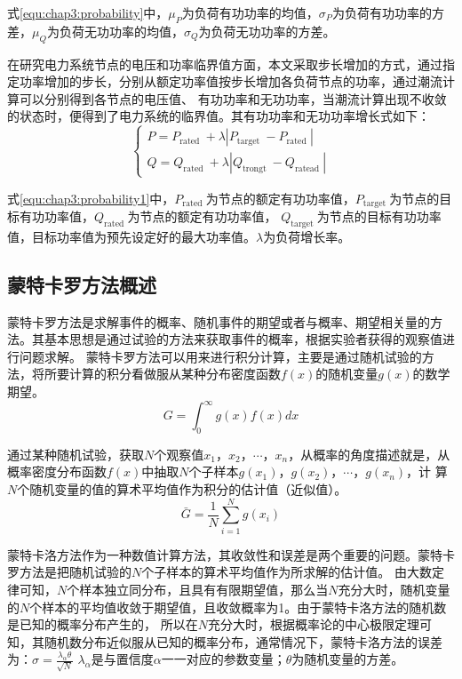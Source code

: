 式\ref{equ:chap3:probability}中，$\mu_{P}$为负荷有功功率的均值，$\sigma_{P}$为负荷有功功率的方差，$\mu_{Q}$为负荷无功功率的均值，$\sigma_{Q}$为负荷无功功率的方差。

在研究电力系统节点的电压和功率临界值方面，本文采取步长增加的方式，通过指定功率增加的步长，分别从额定功率值按步长增加各负荷节点的功率，通过潮流计算可以分别得到各节点的电压值、
有功功率和无功功率，当潮流计算出现不收敛的状态时，便得到了电力系统的临界值。其有功功率和无功功率增长式如下：
\begin{equation}
  \label{equ:chap3:probability1}
  \left\{\begin{array}{l}{P=P_{\text {rated }}+\lambda\left|P_{\text {target }}-P_{\text {rated }}\right|} \\
   {Q=Q_{\text {rated }}+\lambda\left|Q_{\text {trongt }}-Q_{\text {ratead }}\right|}\end{array}\right.
\end{equation}

式\ref{equ:chap3:probability1}中，$P_{\text {rated }}$为节点的额定有功功率值，$P_{\text {target }}$为节点的目标有功功率值，$Q_{\text {rated }}$为节点的额定有功功率值，
$Q_{\text {target }}$为节点的目标有功功率值，目标功率值为预先设定好的最大功率值。$\lambda$为负荷增长率。


\subsection{蒙特卡罗方法概述}
\label{sec:vulneStaus}
蒙特卡罗方法是求解事件的概率、随机事件的期望或者与概率、期望相关量的方法。其基本思想是通过试验的方法来获取事件的概率，根据实验者获得的观察值进行问题求解\cite{refs73,refs74,refs75}。
蒙特卡罗方法可以用来进行积分计算，主要是通过随机试验的方法，将所要计算的积分看做服从某种分布密度函数$f(x)$的随机变量$g(x)$的数学期望。
\begin{equation}
  G=\int_{0}^{\infty} g(x) f(x) d x
  \end{equation}

通过某种随机试验，获取$N$个观察值$x_1，x_2，\cdots，x_n$，从概率的角度描述就是，从概率密度分布函数$f(x)$中抽取$N$个子样本$g(x_1 )，g(x_2 )，\cdots，g(x_n )$，计
算$N$个随机变量的值的算术平均值作为积分的估计值（近似值）。
\begin{equation}
  \bar{G}=\frac{1}{N} \sum_{i=1}^{N} g\left(x_{i}\right)
\end{equation}

蒙特卡洛方法作为一种数值计算方法，其收敛性和误差是两个重要的问题。蒙特卡罗方法是把随机试验的$N$个子样本的算术平均值作为所求解的估计值。
由大数定律可知，$N$个样本独立同分布，且具有有限期望值，那么当$N$充分大时，随机变量的$N$个样本的平均值收敛于期望值，且收敛概率为1。由于蒙特卡洛方法的随机数是已知的概率分布产生的，
所以在$N$充分大时，根据概率论的中心极限定理可知，其随机数分布近似服从已知的概率分布，通常情况下，蒙特卡洛方法的误差为：$\sigma = \frac{\lambda_{\alpha} \theta}{\sqrt{N}}$
$\lambda_{\alpha}$是与置信度$\alpha$一一对应的参数变量；$\theta$为随机变量的方差。


